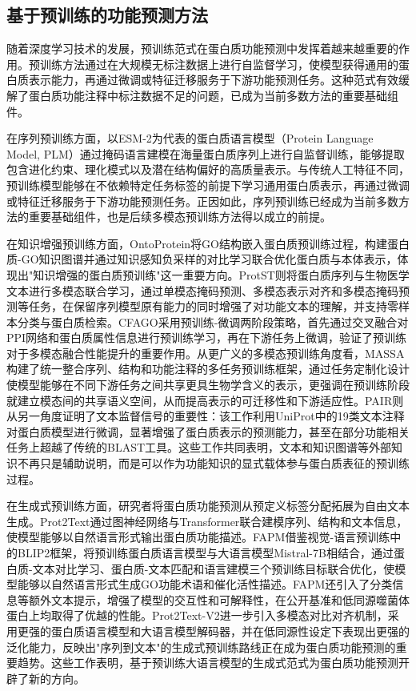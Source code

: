 \subsection{基于预训练的功能预测方法}

随着深度学习技术的发展，预训练范式在蛋白质功能预测中发挥着越来越重要的作用。预训练方法通过在大规模无标注数据上进行自监督学习，使模型获得通用的蛋白质表示能力，再通过微调或特征迁移服务于下游功能预测任务。这种范式有效缓解了蛋白质功能注释中标注数据不足的问题，已成为当前多数方法的重要基础组件。

在序列预训练方面，以ESM-2\cite{lin2023evolutionary}为代表的蛋白质语言模型（Protein Language Model, PLM）通过掩码语言建模在海量蛋白质序列上进行自监督训练，能够提取包含进化约束、理化模式以及潜在结构偏好的高质量表示。与传统人工特征不同，预训练模型能够在不依赖特定任务标签的前提下学习通用蛋白质表示，再通过微调或特征迁移服务于下游功能预测任务。正因如此，序列预训练已经成为当前多数方法的重要基础组件，也是后续多模态预训练方法得以成立的前提。

在知识增强预训练方面，OntoProtein\cite{zhang2022ontoprotein}将GO结构嵌入蛋白质预训练过程，构建蛋白质-GO知识图谱并通过知识感知负采样的对比学习联合优化蛋白质与本体表示，体现出"知识增强的蛋白质预训练"这一重要方向。ProtST\cite{xu2023protst}则将蛋白质序列与生物医学文本进行多模态联合学习，通过单模态掩码预测、多模态表示对齐和多模态掩码预测等任务，在保留序列模型原有能力的同时增强了对功能文本的理解，并支持零样本分类与蛋白质检索。CFAGO\cite{wu2023cfago}采用预训练-微调两阶段策略，首先通过交叉融合对PPI网络和蛋白质属性信息进行预训练学习，再在下游任务上微调，验证了预训练对于多模态融合性能提升的重要作用。从更广义的多模态预训练角度看，MASSA\cite{hu2023multimodal}构建了统一整合序列、结构和功能注释的多任务预训练框架，通过任务定制化设计使模型能够在不同下游任务之间共享更具生物学含义的表示，更强调在预训练阶段就建立模态间的共享语义空间，从而提高表示的可迁移性和下游适应性。PAIR\cite{duan2025pair}则从另一角度证明了文本监督信号的重要性：该工作利用UniProt中的19类文本注释对蛋白质模型进行微调，显著增强了蛋白质表示的预测能力，甚至在部分功能相关任务上超越了传统的BLAST工具。这些工作共同表明，文本和知识图谱等外部知识不再只是辅助说明，而是可以作为功能知识的显式载体参与蛋白质表征的预训练过程。

在生成式预训练方面，研究者将蛋白质功能预测从预定义标签分配拓展为自由文本生成。Prot2Text\cite{abdine2024prot2text}通过图神经网络与Transformer联合建模序列、结构和文本信息，使模型能够以自然语言形式输出蛋白质功能描述。FAPM\cite{xiang2024fapm}借鉴视觉-语言预训练中的BLIP2框架，将预训练蛋白质语言模型与大语言模型Mistral-7B相结合，通过蛋白质-文本对比学习、蛋白质-文本匹配和语言建模三个预训练目标联合优化，使模型能够以自然语言形式生成GO功能术语和催化活性描述。FAPM还引入了分类信息等额外文本提示，增强了模型的交互性和可解释性，在公开基准和低同源噬菌体蛋白上均取得了优越的性能。Prot2Text-V2\cite{fei2025prot2textv2}进一步引入多模态对比对齐机制，采用更强的蛋白质语言模型和大语言模型解码器，并在低同源性设定下表现出更强的泛化能力，反映出"序列到文本"的生成式预训练路线正在成为蛋白质功能预测的重要趋势。这些工作表明，基于预训练大语言模型的生成式范式为蛋白质功能预测开辟了新的方向。

